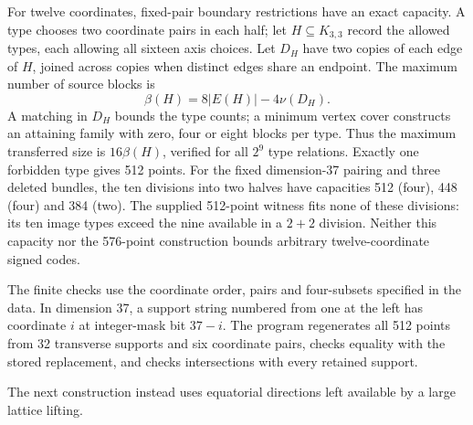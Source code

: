 For twelve coordinates, fixed-pair boundary restrictions have an exact
capacity. A type chooses two coordinate pairs in each half; let
$H\subseteq K_{3,3}$ record the allowed types, each allowing all sixteen
axis choices. Let $D_H$ have two copies of each edge of $H$, joined
across copies when distinct edges share an endpoint. The maximum
number of source blocks is
\[
\beta(H)=8|E(H)|-4\nu(D_H).
\]
A matching in $D_H$ bounds the type counts; a minimum vertex cover
constructs an attaining family with zero, four or eight blocks per type.
Thus the maximum transferred size is $16\beta(H)$, verified for all
$2^9$ type relations. Exactly one forbidden type gives 512 points.
For the fixed dimension-37 pairing and three deleted bundles, the ten
divisions into two halves have capacities 512 (four), 448 (four) and
384 (two). The supplied 512-point witness fits none of these divisions:
its ten image types exceed the nine available in a $2+2$ division.
Neither this capacity nor the 576-point construction bounds arbitrary
twelve-coordinate signed codes.

The finite checks use the coordinate order, pairs and four-subsets
specified in the data. In dimension 37, a support string numbered from
one at the left has coordinate $i$ at integer-mask bit $37-i$.
The program regenerates all 512 points from 32 transverse supports and
six coordinate pairs, checks equality with the stored replacement, and
checks intersections with every retained support.

The next construction instead uses equatorial directions left available
by a large lattice lifting.
